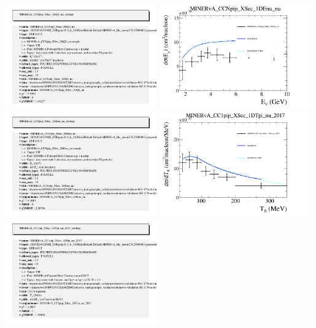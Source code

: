 \documentclass{article}
\begin{document}
\includegraphics[width=0.49\textwidth]{figures/nuisance_MINERvA_CCNpip_XSec_1DQ2_nu_info.png}
\centering
\includegraphics[width=0.49\textwidth]{figures/nuisance_MINERvA_CCNpip_XSec_1DEnu_nu_comp.png}
\includegraphics[width=0.49\textwidth]{figures/nuisance_MINERvA_CCNpip_XSec_1DEnu_nu_info.png}
\centering
\includegraphics[width=0.49\textwidth]{figures/nuisance_MINERvA_CC1pip_XSec_1DTpi_nu_2017_comp.png}
\includegraphics[width=0.49\textwidth]{figures/nuisance_MINERvA_CC1pip_XSec_1DTpi_nu_2017_info.png}
\end{document}
